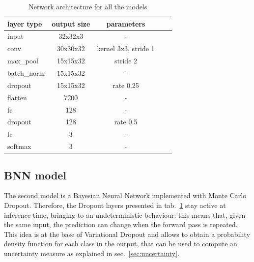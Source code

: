 \documentclass[11pt,twoside,a4paper]{article}
\begin{document}
\begin{table}[!h]
  \begin{adjustwidth}{-.5in}{-.5in}
  \begin{center}
    \begin{tabular}{l | c | c | c | c}
      layer type 	& output size	& parameters \\
      \hline
      input		& 32x32x3	& - \\
      conv		& 30x30x32 	& kernel 3x3, stride 1 \\
      max\_pool		& 15x15x32	& stride 2  \\
      batch\_norm 	& 15x15x32 	& - \\
      dropout		& 15x15x32	& rate 0.25 \\	
      flatten		& 7200		& - \\	
      fc		& 128		& - \\	
      dropout		& 128		& rate 0.5 \\
      fc		& 3		& - \\
      softmax		& 3		& - \\
    \end{tabular}
    \caption{Network architecture for all the models}
    \label{tab:arch}
  \end{center}
  \end{adjustwidth}
\end{table}


\subsection{BNN model}
\label{sec:bnn_model}
The second model is a Bayesian Neural Network implemented with Monte Carlo Dropout. Therefore, the Dropout layers presented in tab.~\ref{tab:arch} stay active at inference time, bringing to an undeterministic behaviour: this means that, given the same input, the prediction can change when the forward pass is repeated. This idea is at the base of Variational Dropout and allows to obtain a probability density function for each class in the output, that can be used to compute an uncertainty measure as explained in sec.~\ref{sec:uncertainty}.
\end{document}
